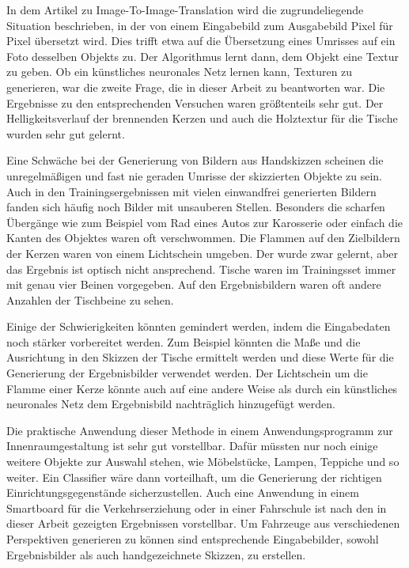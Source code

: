 In dem Artikel zu Image-To-Image-Translation wird die zugrundeliegende Situation beschrieben, in der von einem Eingabebild zum Ausgabebild Pixel für Pixel übersetzt wird. Dies trifft etwa auf die Übersetzung eines Umrisses auf ein Foto desselben Objekts zu. Der Algorithmus lernt dann, dem Objekt eine Textur zu geben. Ob ein künstliches neuronales Netz lernen kann, Texturen zu generieren, war die zweite Frage, die in dieser Arbeit zu beantworten war. Die Ergebnisse zu den entsprechenden Versuchen waren größtenteils sehr gut. Der Helligkeitsverlauf der brennenden Kerzen und auch die Holztextur für die Tische wurden sehr gut gelernt.

Eine Schwäche bei der Generierung von Bildern aus Handskizzen scheinen die unregelmäßigen und fast nie geraden Umrisse der skizzierten Objekte zu sein. Auch in den Trainingsergebnissen mit vielen einwandfrei generierten Bildern fanden sich häufig noch Bilder mit unsauberen Stellen. Besonders die scharfen Übergänge wie zum Beispiel vom Rad eines Autos zur Karosserie oder einfach die Kanten des Objektes waren oft verschwommen. Die Flammen auf den Zielbildern der Kerzen waren von einem Lichtschein umgeben. Der wurde zwar gelernt, aber das Ergebnis ist optisch nicht ansprechend. Tische waren im Trainingsset immer mit genau vier Beinen vorgegeben. Auf den Ergebnisbildern waren oft andere Anzahlen der Tischbeine zu sehen.

Einige der Schwierigkeiten könnten gemindert werden, indem die Eingabedaten noch stärker vorbereitet werden. Zum Beispiel könnten die Maße und die Ausrichtung in den Skizzen der Tische ermittelt werden und diese Werte für die Generierung der Ergebnisbilder verwendet werden. Der Lichtschein um die Flamme einer Kerze könnte auch auf eine andere Weise als durch ein künstliches neuronales Netz dem Ergebnisbild nachträglich hinzugefügt werden.

Die praktische Anwendung dieser Methode in einem Anwendungsprogramm zur Innenraumgestaltung ist sehr gut vorstellbar. Dafür müssten nur noch einige weitere Objekte zur Auswahl stehen, wie Möbelstücke, Lampen, Teppiche und so weiter. Ein Classifier wäre dann vorteilhaft, um die Generierung der richtigen Einrichtungsgegenstände sicherzustellen. Auch eine Anwendung in einem Smartboard für die Verkehrserziehung oder in einer Fahrschule ist nach den in dieser Arbeit gezeigten Ergebnissen vorstellbar. Um Fahrzeuge aus verschiedenen Perspektiven generieren zu können sind entsprechende Eingabebilder, sowohl Ergebnisbilder als auch handgezeichnete Skizzen, zu erstellen.
